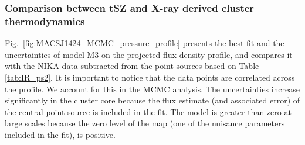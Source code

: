 \documentclass[twocolumn,traditabstract]{aa}
\begin{document}
\subsubsection{Comparison between tSZ and X-ray derived cluster thermodynamics}
Fig.~\ref{fig:MACSJ1424_MCMC_pressure_profile} presents the best-fit and the uncertainties of model M3 on the projected flux density profile, and compares it with the NIKA data subtracted from the point sources based on Table \ref{tab:IR_ps2}. It is important to notice that the data points are correlated across the profile. We account for this in the MCMC analysis. The uncertainties increase significantly in the cluster core because the flux estimate (and associated error) of the central point source is included in the fit. The model is greater than zero at large scales because the zero level of the map (one of the nuisance parameters included in the fit), is positive.
\end{document}
